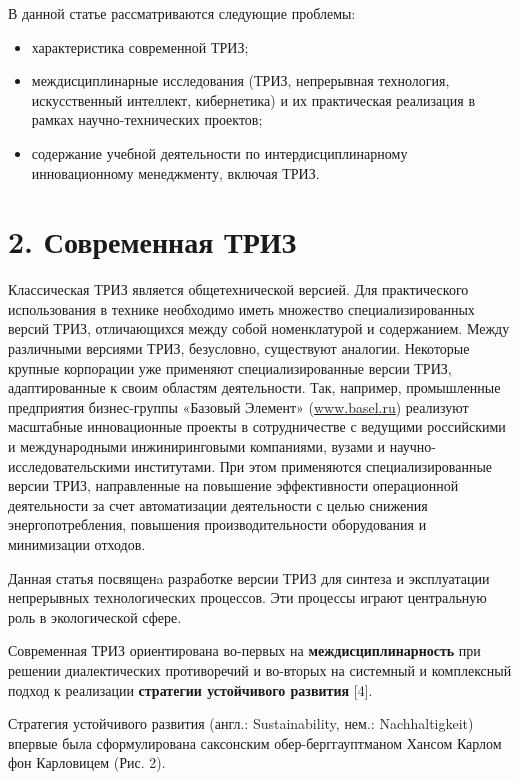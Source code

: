 \documentclass[11pt,a4paper]{article}
\begin{document}
В данной статье рассматриваются следующие проблемы:
\begin{itemize}
\item характеристика современной ТРИЗ;
\item междисциплинарные исследования (ТРИЗ, непрерывная технология,
  искусственный интеллект, кибернетика) и их практическая реализация в рамках
  научно-технических проектов;
\item содержание учебной деятельности по интердисциплинарному инновационному
  менеджменту, включая ТРИЗ.
\end{itemize}
\section*{2. Современная ТРИЗ}
Классическая ТРИЗ является общетехнической версией. Для практического
использования в технике необходимо иметь множество специализированных версий
ТРИЗ, отличающихся между собой номенклатурой и содержанием. Между различными
версиями ТРИЗ, безусловно, существуют аналогии. Некоторые крупные корпорации
уже применяют специализированные версии ТРИЗ, адаптированные к своим областям
деятельности. Так, например, промышленные предприятия бизнес-группы «Базовый
Элемент» (\url{www.basel.ru}) реализуют масштабные инновационные проекты в
сотрудничестве с ведущими российскими и международными инжиниринговыми
компаниями, вузами и научно-исследовательскими институтами. При этом
применяются специализированные версии ТРИЗ, направленные на повышение
эффективности операционной деятельности за счет автоматизации деятельности с
целью снижения энергопотребления, повышения производительности оборудования и
минимизации отходов.

Данная статья посвященa разработке версии ТРИЗ для синтеза и эксплуатации
непрерывных технологических процессов. Эти процессы играют центральную роль в
экологической сфере.

Современная ТРИЗ ориентирована во-первых на \textbf{междисциплинарность} при
решении диалектических противоречий и во-вторых на системный и комплексный
подход к реализации \textbf{стратегии устойчивого развития} [4].

Стратегия устойчивого развития (англ.: Sustainability, нем.: Nachhaltigkeit)
впервые была сформулирована саксонским обер-берггауптманом Хансом Карлом фон
Карловицем (Рис. 2).
\end{document}
